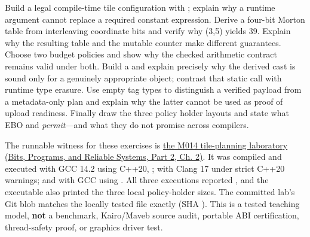Build a legal compile-time tile configuration with ; explain why a runtime argument cannot replace a required constant expression. Derive a four-bit Morton table from interleaving coordinate bits and verify why (3,5) yields 39. Explain why the resulting  table and the  mutable counter make different guarantees. Choose two budget policies and show why the checked arithmetic contract remains valid under both. Build a  and explain precisely why the derived cast is sound only for a genuinely appropriate object; contrast that static call with runtime type erasure. Use empty tag types to distinguish a verified payload from a metadata-only plan and explain why the latter cannot be used as proof of upload readiness. Finally draw the three policy holder layouts and state what EBO and  \emph{permit}---and what they do not promise across compilers.

The runnable witness for these exercises is \href{../01-Bits-Programs-and-Reliable-Systems-P02/main.pdf\#nameddest=source-file-f5eb017280bb6b2ae6b1475d}{the M014 tile-planning laboratory (Bits, Programs, and Reliable Systems, Part 2, Ch. 2)}. It was compiled and executed with GCC 14.2 using C++20, ; with Clang 17 under strict C++20 warnings; and with GCC using . All three executions reported , and the executable also printed the three local policy-holder sizes. The committed lab's Git blob matches the locally tested file exactly (SHA ). This is a tested teaching model, \textbf{not} a benchmark, Kairo/Maveb source audit, portable ABI certification, thread-safety proof, or graphics driver test.

